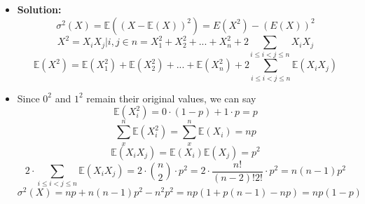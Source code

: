 \documentclass[hidelinks]{article}
\begin{document}
\begin{itemize}
   \begin{itemize}
       \item[ ] \textbf{Solution: }
        \[
            \sigma^2(X) = \mathbb{E}((X - \mathbb{E}(X))^2) 
            = E(X^2) - (E(X))^2
        \]
        \[
            X^2 = X_i X_j | i, j \in n = X_1^2 + X_2^2 + ... + X^2_n + 2 \sum_{i \leq i < j \leq n} X_iX_j
        \]
        \[
            \mathbb{E}(X^2) = \mathbb{E}(X_1^2) + \mathbb{E}(X_2^2) + ... + \mathbb{E}(X_n^2) + 2 \sum_{i \leq i < j \leq n} \mathbb{E}(X_iX_j)
        \]
    \item[ ] Since $0^2$ and $1^2$ remain their original values, we can say 
    \[
        \mathbb{E}(X_i^2) = 0\cdot(1 - p) + 1 \cdot p = p
    \]
    \[
        \sum_x^n \mathbb{E}(X_i^2) = \sum_x^n \mathbb{E}(X_i)= np
    \]
    \[
        \mathbb{E}(X_iX_j) = \mathbb{E}(X_i)\mathbb{E}(X_j) = p^2
    \]
    \[
        2 \cdot \sum_{i \leq i < j \leq n} \mathbb{E}(X_iX_j) = 2\cdot \binom{n}{2} \cdot p^2 = 2 \cdot \frac{n!}{(n-2)!2!} \cdot p^2 = n(n-1)p^2
    \]
    \[
        \sigma^2(X) =np + n(n -1)p^2 - n^2p^2 =  np(1 + p(n -1) - np) = np(1 - p)
    \]
    \end{itemize}
    \end{itemize}
\end{document}
